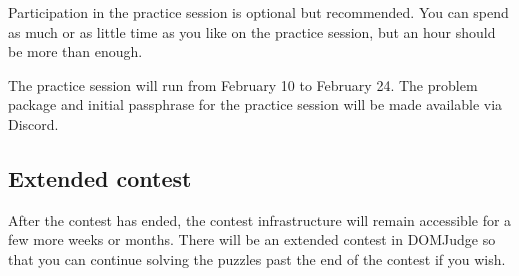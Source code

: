 \documentclass[fontsize=10pt,a4paper,DIV=12,parskip=half]{scrarticle}
\begin{document}
Participation in the practice session is optional but recommended.
You can spend as much or as little time as you like
on the practice session, but an hour should be more than enough.

The practice session will run
from February 10 to February 24. The problem package and initial passphrase for the practice session
will be made available via Discord.

\subsection*{Extended contest}
After the contest has ended, the contest infrastructure will remain accessible for
a few more weeks or months. There will be an extended contest in DOMJudge so that you can
continue solving the puzzles past the end of the contest if you wish.
\end{document}
